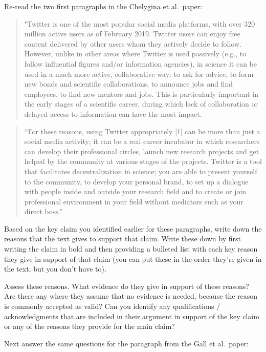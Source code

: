 \documentclass[]{tufte-book}
\begin{document}
Re-read the two first paragraphs in the Chelygina et al.~paper:

\begin{quote}
"Twitter is one of the most popular social media platforms, with over 320
million active users as of February 2019. Twitter users can enjoy free content
delivered by other users whom they actively decide to follow. However, unlike in
other areas where Twitter is used passively (e.g., to follow influential figures
and/or information agencies), in science it can be used in a much more active,
collaborative way: to ask for advice, to form new bonds and scientific
collaborations, to announce jobs and find employees, to find new mentors and
jobs. This is particularly important in the early stages of a scientific career,
during which lack of collaboration or delayed access to information can have the
most impact.
\end{quote}

\begin{quote}
``For these reasons, using Twitter appropriately {[}1{]} can be more than
just a social media activity; it can be a real career incubator in which
researchers can develop their professional circles, launch new research projects
and get helped by the community at various stages of the projects. Twitter is a
tool that facilitates decentralization in science; you are able to present
yourself to the community, to develop your personal brand, to set up a dialogue
with people inside and outside your research field and to create or join
professional environment in your field without mediators such as your direct
boss.''
\end{quote}

Based on the key claim you identified earlier for these paragraphs, write down
the reasons that the text gives to support that claim. Write these down by
first writing the claim in bold and then providing a bulleted list with
each key reason they give in support of that claim (you can put these in
the order they're given in the text, but you don't have to).

Assess these reasons. What evidence do they give in support of these reasons?
Are there any where they assume that no evidence is needed, because the reason
is commonly accepted as valid? Can you identify any qualifications /
acknowledgments that are included in their argument in support of the key claim
or any of the reasons they provide for the main claim?

Next answer the same questions for the paragraph from the Gall et al.~paper:
\end{document}
